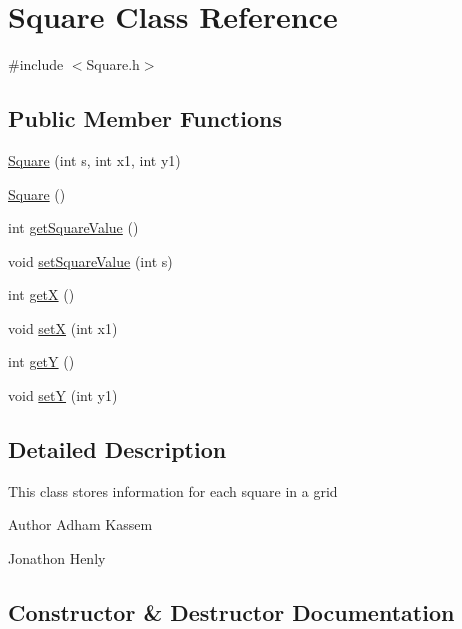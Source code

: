 \hypertarget{classSquare}{}\section{Square Class Reference}
\label{classSquare}


{\ttfamily \#include $<$Square.\+h$>$}

\subsection*{Public Member Functions}
\begin{DoxyCompactItemize}
\item 
\hyperlink{classSquare_a618da183ebaea5483ef5561788d37fe7}{Square} (int s, int x1, int y1)
\item 
\hyperlink{classSquare_a3dc7ff9aefc2725172b5d3153973d243}{Square} ()
\item 
int \hyperlink{classSquare_a76930b9e6fab38e40de0cebdb51ee36e}{get\+Square\+Value} ()
\item 
void \hyperlink{classSquare_aeb716f4ab553e505806929e43c130396}{set\+Square\+Value} (int s)
\item 
int \hyperlink{classSquare_a16d53c26c499c731898826701c1bee3f}{getX} ()
\item 
void \hyperlink{classSquare_a293b509400700682b1774ce5800e2b04}{setX} (int x1)
\item 
int \hyperlink{classSquare_a9c566a530c16ace9afb5861bf67739aa}{getY} ()
\item 
void \hyperlink{classSquare_ae848f077c458cd512218c1152f31dba0}{setY} (int y1)
\end{DoxyCompactItemize}


\subsection{Detailed Description}
This class stores information for each square in a grid \begin{DoxyAuthor}{Author}
Adham Kassem 

Jonathon Henly 
\end{DoxyAuthor}


\subsection{Constructor \& Destructor Documentation}
\mbox{\label{classSquare_a618da183ebaea5483ef5561788d37fe7}} 
